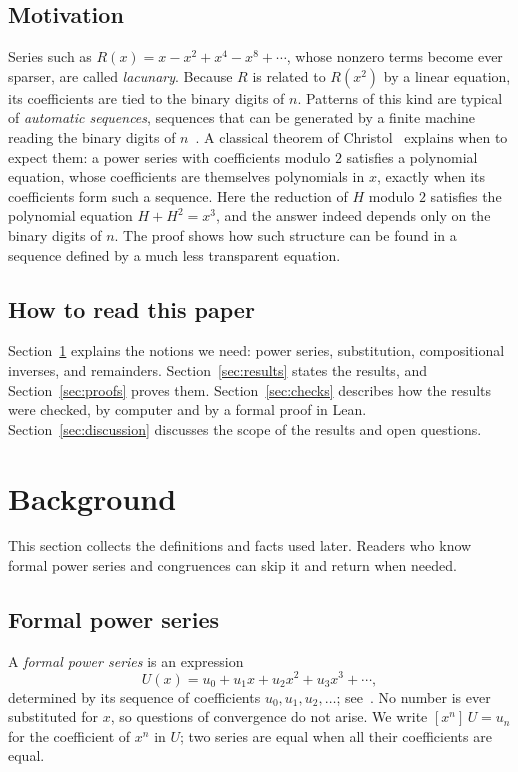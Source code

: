 \documentclass[11pt,a4paper]{article}
\theoremstyle{definition}
\theoremstyle{remark}
\newcommand{\coeff}[2]{[x^{#1}]\,#2}
\begin{document}
\subsection{Motivation}
Series such as $R(x)=x-x^2+x^4-x^8+\cdots$, whose nonzero terms become ever sparser, are called \emph{lacunary}. Because
$R$ is related to $R(x^2)$ by a linear equation, its coefficients are tied to the binary digits of $n$. Patterns of this
kind are typical of \emph{automatic sequences}, sequences that can be generated by a finite machine reading the binary
digits of $n$~\cite{allouche}. A classical theorem of Christol~\cite{christol} explains when to expect them: a power series
with coefficients modulo $2$ satisfies a polynomial equation, whose coefficients are themselves polynomials in $x$,
exactly when its coefficients form such a sequence. Here
the reduction of $H$ modulo $2$ satisfies the polynomial equation $H+H^2=x^3$, and the answer indeed depends only on the
binary digits of $n$. The proof shows how such structure can be found in a sequence defined by a much less transparent
equation.

\subsection{How to read this paper}
Section~\ref{sec:background} explains the notions we need: power series, substitution, compositional inverses, and
remainders. Section~\ref{sec:results} states the results, and Section~\ref{sec:proofs} proves them.
Section~\ref{sec:checks} describes how the results were checked, by computer and by a formal proof in Lean.
Section~\ref{sec:discussion} discusses the scope of the results and open questions.
\section{Background}\label{sec:background}
This section collects the definitions and facts used later. Readers who know formal power series and congruences can skip it and return when needed.
\subsection{Formal power series}
A \emph{formal power series} is an expression
\[
U(x)=u_0+u_1x+u_2x^2+u_3x^3+\cdots ,
\]
determined by its sequence of coefficients $u_0,u_1,u_2,\dots$; see~\cite{niven,stanley}. No number is ever
substituted for $x$, so questions of convergence do not arise. We write $\coeff{n}{U}=u_n$ for the coefficient of $x^n$ in $U$; two series are equal
when all their coefficients are equal.
\end{document}
